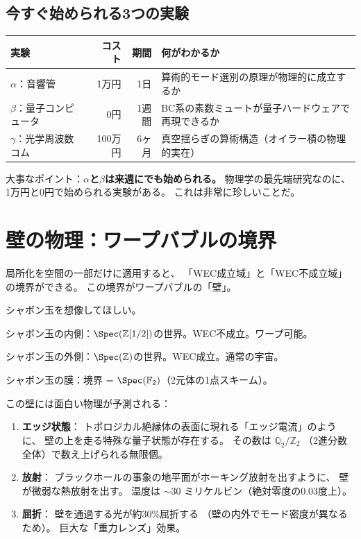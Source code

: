 \documentclass[12pt,a4paper]{article}
\begin{document}
\subsection{今すぐ始められる3つの実験}

\begin{keybox}[3つの即実行可能実験]
\begin{tabular}{lrrp{6cm}}
\toprule
実験 & コスト & 期間 & 何がわかるか \\
\midrule
$\alpha$：音響管 & 1万円 & 1日 & 算術的モード選別の原理が物理的に成立するか \\
$\beta$：量子コンピュータ & 0円 & 1週間 & BC系の素数ミュートが量子ハードウェアで再現できるか \\
$\gamma$：光学周波数コム & 100万円 & 6ヶ月 & 真空揺らぎの算術構造（オイラー積の物理的実在） \\
\bottomrule
\end{tabular}
\end{keybox}

大事なポイント：\textbf{$\alpha$と$\beta$は来週にでも始められる。}
物理学の最先端研究なのに、1万円と0円で始められる実験がある。
これは非常に珍しいことだ。

\section{壁の物理：ワープバブルの境界}

局所化を空間の一部だけに適用すると、
「WEC成立域」と「WEC不成立域」の境界ができる。
この境界がワープバブルの「壁」。

\begin{analogybox}
シャボン玉を想像してほしい。

シャボン玉の内側：$\Spec(\mathbb{Z}[1/2])$の世界。WEC不成立。ワープ可能。

シャボン玉の外側：$\Spec(\mathbb{Z})$の世界。WEC成立。通常の宇宙。

シャボン玉の膜：境界 = $\Spec(\mathbb{F}_2)$（2元体の1点スキーム）。
\end{analogybox}

この壁には面白い物理が予測される：

\begin{enumerate}
\item \textbf{エッジ状態}：
  トポロジカル絶縁体の表面に現れる「エッジ電流」のように、
  壁の上を走る特殊な量子状態が存在する。
  その数は $\mathbb{Q}_2/\mathbb{Z}_2$
  （2進分数全体）で数え上げられる無限個。

\item \textbf{放射}：
  ブラックホールの事象の地平面がホーキング放射を出すように、
  壁が微弱な熱放射を出す。
  温度は $\sim 30$ ミリケルビン（絶対零度の0.03度上）。

\item \textbf{屈折}：
  壁を通過する光が約30\%屈折する
  （壁の内外でモード密度が異なるため）。
  巨大な「重力レンズ」効果。
\end{enumerate}
\end{document}

